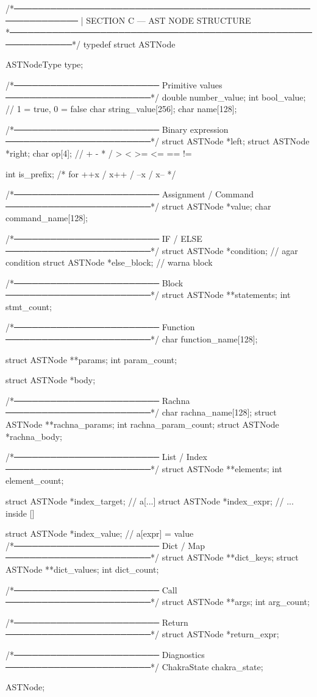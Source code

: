 \documentclass{article}
\begin{document}
/*─────────────────────────────────────────────────────────────
 | SECTION C — AST NODE STRUCTURE
 *─────────────────────────────────────────────────────────────*/
typedef struct ASTNode {

    ASTNodeType type;

    /*────────────────────────
      Primitive values
    ────────────────────────*/
    double  number_value;
    int  bool_value;     // 1 = true, 0 = false
    char string_value[256];
    char name[128];

    /*────────────────────────
      Binary expression
    ────────────────────────*/
    struct ASTNode *left;
    struct ASTNode *right;
    char op[4];                 // + - * / > < >= <= == !=

    int is_prefix;   /* for ++x / x++ / --x / x-- */

    /*────────────────────────
      Assignment / Command
    ────────────────────────*/
    struct ASTNode *value;
    char command_name[128];

    /*────────────────────────
      IF / ELSE
    ────────────────────────*/
    struct ASTNode *condition;   // agar condition
    struct ASTNode *else_block;  // warna block

    /*────────────────────────
      Block
    ────────────────────────*/
    struct ASTNode **statements;
    int stmt_count;

/*────────────────────────
      Function
    ────────────────────────*/
    char function_name[128];

    struct ASTNode **params;
    int param_count;

    struct ASTNode *body;

/*────────────────────────
  Rachna
────────────────────────*/
char rachna_name[128];
struct ASTNode **rachna_params;
int rachna_param_count;
struct ASTNode *rachna_body;

/*────────────────────────
      List / Index
    ────────────────────────*/
    struct ASTNode **elements;
    int element_count;

    struct ASTNode *index_target;   // a[...]
    struct ASTNode *index_expr;     // ... inside []

    struct ASTNode *index_value;    // a[expr] = value
/*────────────────────────
      Dict / Map
    ────────────────────────*/
    struct ASTNode **dict_keys;
    struct ASTNode **dict_values;
    int dict_count;

    /*────────────────────────
      Call
    ────────────────────────*/
    struct ASTNode **args;
    int arg_count;

    /*────────────────────────
      Return
    ────────────────────────*/
    struct ASTNode *return_expr;

    /*────────────────────────
      Diagnostics
    ────────────────────────*/
    ChakraState chakra_state;

} ASTNode;
\end{document}
